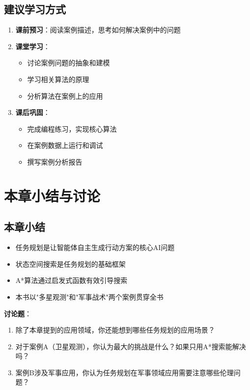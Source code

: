 \subsection{建议学习方式}

\begin{enumerate}[leftmargin=2em]
  \item \textbf{课前预习}：阅读案例描述，思考如何解决案例中的问题
  \item \textbf{课堂学习}：
  \begin{itemize}
    \item 讨论案例问题的抽象和建模
    \item 学习相关算法的原理
    \item 分析算法在案例上的应用
  \end{itemize}
  \item \textbf{课后巩固}：
  \begin{itemize}
    \item 完成编程练习，实现核心算法
    \item 在案例数据上运行和调试
    \item 撰写案例分析报告
  \end{itemize}
\end{enumerate}

\section{本章小结与讨论}

\subsection*{本章小结}

\begin{itemize}[leftmargin=2em]
  \item 任务规划是让智能体自主生成行动方案的核心AI问题
  \item 状态空间搜索是任务规划的基础框架
  \item A*算法通过启发式函数有效引导搜索
  \item 本书以"多星观测"和"军事战术"两个案例贯穿全书
\end{itemize}

\begin{discussbox}
\textbf{讨论题}：
\begin{enumerate}
  \item 除了本章提到的应用领域，你还能想到哪些任务规划的应用场景？
  \item 对于案例A（卫星观测），你认为最大的挑战是什么？如果只用A*搜索能解决吗？
  \item 案例B涉及军事应用，你认为任务规划在军事领域应用需要注意哪些伦理问题？
\end{enumerate}
\end{discussbox}
